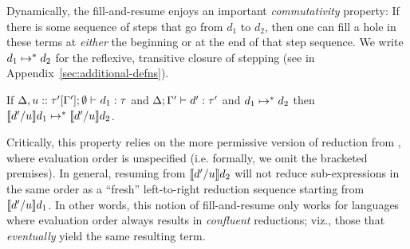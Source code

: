 Dynamically, the fill-and-resume enjoys an
important \emph{commutativity} property: If there is some sequence of
steps that go from $d_1$ to $d_2$, then one can fill a hole in these
terms at \emph{either} the beginning or at the end of that step
sequence.
%
We write $d_1 \mapsto^* d_2$ for the reflexive,
transitive closure of stepping (see  in
Appendix~\ref{sec:additional-defns}).
%
\begin{thm}[Commutativity]
  If $\Delta, u :: \tau'[\Gamma']; \emptyset \vdash d_1 : \tau$
  and $\Delta; \Gamma' \vdash d' : \tau'$ and $d_1 \mapsto^* d_2$
  then $\llbracket d' / u\rrbracket d_1 \mapsto^* \llbracket d' / u\rrbracket d_2$.
\end{thm}
%
Critically, this property relies on the more permissive version of
reduction from , where evaluation order is
unspecified (i.e. formally, we omit the bracketed premises).
%
In general, resuming from $\llbracket d' / u\rrbracket d_2$ will not
reduce sub-expressions in the same order as a ``fresh'' left-to-right
reduction sequence starting from $\llbracket d' / u\rrbracket d_1$.
%
In other words, this notion of fill-and-resume only works for
languages where evaluation order always results in \emph{confluent}
reductions; viz., those that \emph{eventually} yield the same
resulting term.


